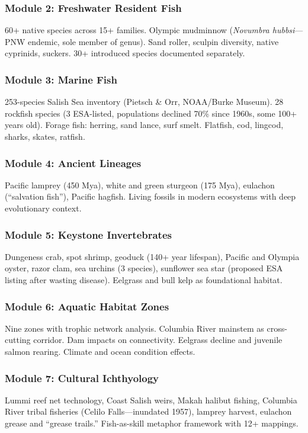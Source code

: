 \documentclass[11pt,letterpaper]{article}
\begin{document}
\subsubsection{Module 2: Freshwater Resident Fish}
60+ native species across 15+ families. Olympic mudminnow (\textit{Novumbra hubbsi}---PNW endemic, sole member of genus). Sand roller, sculpin diversity, native cyprinids, suckers. 30+ introduced species documented separately.

\subsubsection{Module 3: Marine Fish}
253-species Salish Sea inventory (Pietsch \& Orr, NOAA/Burke Museum). 28 rockfish species (3 ESA-listed, populations declined 70\% since 1960s, some 100+ years old). Forage fish: herring, sand lance, surf smelt. Flatfish, cod, lingcod, sharks, skates, ratfish.

\subsubsection{Module 4: Ancient Lineages}
Pacific lamprey (450 Mya), white and green sturgeon (175 Mya), eulachon (``salvation fish''), Pacific hagfish. Living fossils in modern ecosystems with deep evolutionary context.

\subsubsection{Module 5: Keystone Invertebrates}
Dungeness crab, spot shrimp, geoduck (140+ year lifespan), Pacific and Olympia oyster, razor clam, sea urchins (3 species), sunflower sea star (proposed ESA listing after wasting disease). Eelgrass and bull kelp as foundational habitat.

\subsubsection{Module 6: Aquatic Habitat Zones}
Nine zones with trophic network analysis. Columbia River mainstem as cross-cutting corridor. Dam impacts on connectivity. Eelgrass decline and juvenile salmon rearing. Climate and ocean condition effects.

\subsubsection{Module 7: Cultural Ichthyology}
Lummi reef net technology, Coast Salish weirs, Makah halibut fishing, Columbia River tribal fisheries (Celilo Falls---inundated 1957), lamprey harvest, eulachon grease and ``grease trails.'' Fish-as-skill metaphor framework with 12+ mappings.
\end{document}
